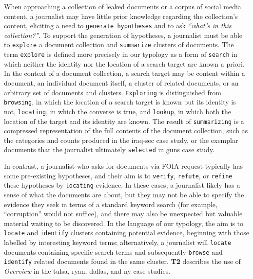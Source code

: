 When approaching a collection of leaked documents or a corpus of social media content, a journalist may have little prior knowledge regarding the collection's content, eliciting a need to {\tt generate hypotheses} and to ask {\it ``what's in this collection?''}.
To support the generation of hypotheses, a journalist must be able to {\tt explore} a document collection and {\tt summarize} clusters of documents.
The term {\tt explore} is defined more precisely in our typology as a form of {\tt search} in which neither the identity nor the location of a search target are known a priori.
In the context of a document collection, a search target may be content within a document, an individual document itself, a cluster of related documents, or an arbitrary set of documents and clusters.
{\tt Exploring} is distinguished from {\tt browsing}, in which the location of a search target is known but its identity is not, {\tt locating}, in which the converse is true, and {\tt lookup}, in which both the location of the target and its identity are known. 
The result of {\tt summarizing} is a compressed representation of the full contents of the document collection, such as the categories and counts produced in the {\sc iraq-sec} case study, or the exemplar documents that the journalist ultimately {\tt selected} in {\sc guns} case study.

In contrast, a journalist who asks for documents via \ac{FOIA} request typically has some pre-existing hypotheses, and their aim is to {\tt verify}, {\tt refute}, or {\tt refine} these hypotheses by {\tt locating} evidence.
In these cases, a journalist likely has a sense of what the documents are about, but they may not be able to specify the evidence they seek in terms of a standard keyword search (for example, ``corruption'' would not suffice), and there may also be unexpected but valuable material waiting to be discovered.
In the language of our typology, the aim is to {\tt locate} and {\tt identify} clusters containing potential evidence, beginning with those labelled by interesting keyword terms; alternatively, a journalist will {\tt locate} documents containing specific search terms and subsequently {\tt browse} and {\tt identify} related documents found in the same cluster.
{\bf T2} describes the use of {\it Overview} in the {\sc tulsa}, {\sc ryan}, {\sc dallas}, and {\sc ny} case studies.

